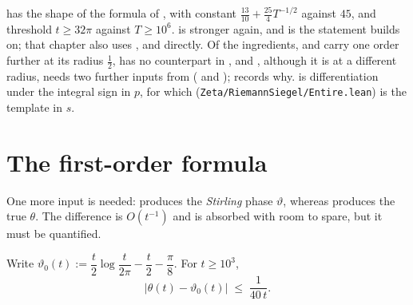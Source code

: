 \begin{remark}
\label{rem:rsf_supersede}
 has the shape of the formula of , with
constant $\tfrac{13}{10}+\tfrac{25}4T^{-1/2}$ against $45$, and threshold $t\ge32\pi$ against
$T\ge10^{6}$.   is stronger again, and is the statement
 builds on; that chapter also uses ,
 and  directly.  Of the ingredients,
 and  carry 
one order further at its radius $\tfrac12$,  has no counterpart in
, and , although it is  at a
different radius, needs two further inputs from 
( and );
 records why.   is differentiation under the integral
sign in $p$, for which  (\texttt{Zeta/RiemannSiegel/Entire.lean}) is the
template in $s$.
\end{remark}

\section{The first-order formula}
\label{sec:rsf_formula}

One more input is needed:  produces the \emph{Stirling} phase
$\vartheta$, whereas  produces the true $\theta$.  The difference is
$O(t^{-1})$ and is absorbed with room to spare, but it must be quantified.

\begin{lemma}
\label{lem:rsf_theta}
\leanok
{}
Write $\vartheta_{0}(t):=\dfrac t2\log\dfrac t{2\pi}-\dfrac t2-\dfrac\pi8$.  For $t\ge10^{3}$,
\[
  \bigl\lvert\theta(t)-\vartheta_{0}(t)\bigr\rvert\;\le\;\frac1{40\,t} .
\]
\end{lemma}

